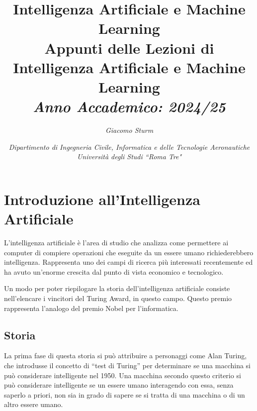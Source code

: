 \documentclass{article}
\numberwithin{equation}{subsection}
\begin{document}
\title{%
    \textbf{Intelligenza Artificiale e Machine Learning}  \\ 
    \large Appunti delle Lezioni di Intelligenza Artificiale e Machine Learning \\
    \textit{Anno Accademico: 2024/25}}
\author{\textit{Giacomo Sturm}}
\date{\textit{Dipartimento di Ingegneria Civile, Informatica e delle Tecnologie Aeronautiche \\
Università degli Studi ``Roma Tre"}}

\maketitle
\thispagestyle{link}

\clearpage


\pagestyle{fancy}
\fancyhead{}\fancyfoot{}
\fancyfoot[C]{\thepage}

\tableofcontents

\clearpage
{}

\section{Introduzione all'Intelligenza Artificiale}

L'intelligenza artificiale è l'area di studio che analizza come permettere ai computer di 
compiere operazioni che eseguite da un essere umano richiederebbero intelligenza. 
Rappresenta uno dei campi di ricerca più interessati recentemente ed ha avuto un'enorme 
crescita dal punto di vista economico e tecnologico. 

Un modo per poter riepilogare la storia dell'intelligenza artificiale consiste nell'elencare 
i vincitori del Turing Award, in questo campo. Questo premio rappresenta l'analogo del 
premio Nobel per l'informatica. 

\subsection{Storia}

La prima fase di questa storia si può attribuire a personaggi come Alan Turing, che introdusse 
il concetto di ``test di Turing'' per determinare se una macchina si può considerare 
intelligente nel 1950. Una macchina secondo questo criterio si può considerare intelligente se 
un essere umano interagendo con essa, senza saperlo a priori, non sia in grado di sapere 
se si tratta di una macchina o di un altro essere umano. 
\end{document}
